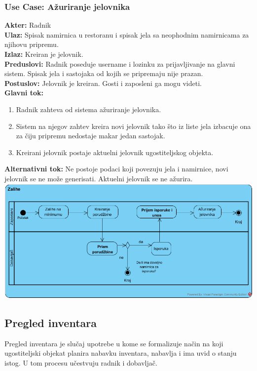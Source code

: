 \documentclass{article}
\begin{document}
\subsubsection{\textbf{Use Case}: Ažuriranje jelovnika}
\textbf{Akter:} Radnik\\
\textbf{Ulaz:} Spisak namirnica u restoranu i spisak jela sa neophodnim namirnicama za njihovu pripremu.\\
\textbf{Izlaz:} Kreiran je jelovnik.\\
\textbf{Preduslovi:} Radnik poseduje username i lozinku za prijavljivanje na glavni sistem. Spisak jela i sastojaka od kojih se pripremaju nije prazan.\\
\textbf{Postuslov:} Jelovnik je kreiran. Gosti i zaposleni ga mogu videti.\\
\textbf{Glavni tok:} 
\begin{enumerate}
	\item Radnik zahteva od sistema ažuriranje jelovnika.
	\item Sistem na njegov zahtev kreira novi jelovnik tako što iz liste jela izbacuje ona za čiju pripremu nedostaje makar jedan sastojak.
	\item Kreirani jelovnik postaje aktuelni jelovnik ugostiteljskog objekta.
\end{enumerate}
\textbf{Alternativni tok:} Ne postoje podaci koji povezuju jela i namirnice, novi jelovnik se ne može generisati. Aktuelni jelovnik se ne ažurira.\\
\includegraphics[width=\textwidth]{SU_1_zalihe_activity.png}


\subsection{Pregled inventara}
Pregled inventara je slučaj upotrebe u kome se formalizuje način na koji ugostiteljski objekat planira nabavku inventara, nabavlja i ima uvid o stanju istog. U tom procesu učestvuju radnik i dobavljač. 
\end{document}
